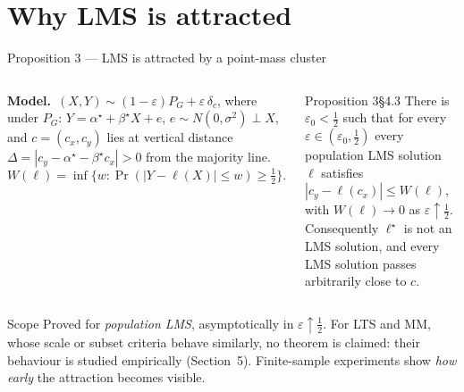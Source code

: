 \documentclass[aspectratio=169,9pt]{beamer}
\begin{document}
\section{Why LMS is attracted}
\begin{frame}{Proposition 3 --- LMS is attracted by a point-mass cluster}
\begin{columns}[T]
\textbf{Model.}\ $(X,Y)\sim(1-\varepsilon)P_G+\varepsilon\,\delta_c$, where under $P_G$: $Y=\alpha^\star+\beta^\star X+e$, $e\sim N(0,\sigma^2)\perp X$, and $c=(c_x,c_y)$ lies at vertical distance $\Delta=|c_y-\alpha^\star-\beta^\star c_x|>0$ from the majority line.
\[W(\ell)=\inf\{w:\Pr(|Y-\ell(X)|\le w)\ge\tfrac12\}.\]
\begin{rthm}{Proposition 3}{}{\S4.3}
There is $\varepsilon_0<\tfrac12$ such that for every $\varepsilon\in(\varepsilon_0,\tfrac12)$ every population LMS solution $\ell$ satisfies
$|c_y-\ell(c_x)|\le W(\ell)$, with $W(\ell)\to0$ as $\varepsilon\uparrow\tfrac12$.\\
Consequently $\ell^\star$ is not an LMS solution, and every LMS solution passes arbitrarily close to $c$.
\end{rthm}
\end{columns}
\begin{rwarn}{Scope}
Proved for \emph{population LMS}, asymptotically in $\varepsilon\uparrow\tfrac12$. For LTS and MM, whose scale or subset criteria behave similarly, no theorem is claimed: their behaviour is studied empirically (Section~5). Finite-sample experiments show \emph{how early} the attraction becomes visible.
\end{rwarn}
\end{frame}
\end{document}

